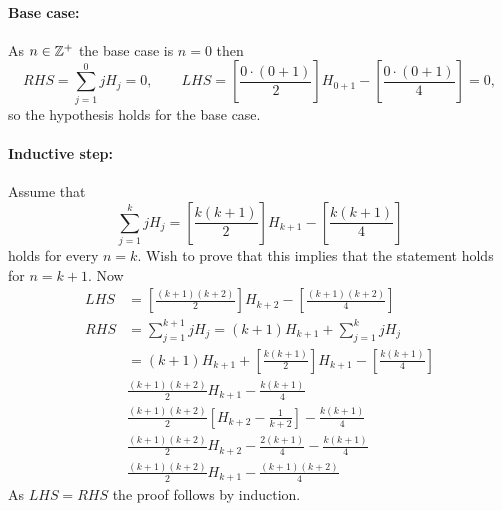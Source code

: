 \documentclass[a4paper, english, 12pt]{article} %
\begin{document}
\begin{answer}
  \paragraph{Base case:} As $n \in \mathbb{Z}^+$ the base case is $n=0$ then
  \begin{equation*}
    RHS = \sum_{j=1}^{0} j H_j = 0, \qquad 
    LHS  
    = \left[ \frac{0 \cdot (0+1)}{2} \right] H_{0+1} - \left[ \frac{0 \cdot (0+1)}{4} \right] = 0,
  \end{equation*}
  so the hypothesis holds for the base case.
  
  \paragraph{Inductive step:}Assume that
  \begin{equation*}
    \sum_{j=1}^k j H_j
    = \left[ \frac{k(k+1)}{2} \right] H_{k+1} - \left[ \frac{k(k+1)}{4} \right]
  \end{equation*}
  holds for every $n = k$. Wish to prove that this implies that the statement
  holds for $n = k + 1$. Now
  \begin{align*}
    LHS & = \left[ \frac{(k+1)(k+2)}{2} \right] H_{k+2} - \left[ \frac{(k+1)(k+2)}{4} \right]\\
    RHS & = \sum_{j=1}^{k+1} j H_j = (k+1) H_{k+1} + \sum_{j=1}^{k} j H_j \\
        & = (k+1)H_{k+1} + \left[ \frac{k(k+1)}{2} \right] H_{k+1} - \left[ \frac{k(k+1)}{4} \right] \\
        & \frac{(k+1)(k+2)}{2} H_{k+1} - \frac{k(k+1)}{4} \\
        & \frac{(k+1)(k+2)}{2} \left[ H_{k+2} - \frac{1}{k+2} \right] - \frac{k(k+1)}{4} \\
        & \frac{(k+1)(k+2)}{2} H_{k+2} - \frac{2(k+1)}{4} - \frac{k(k+1)}{4} \\
        & \frac{(k+1)(k+2)}{2} H_{k+1} - \frac{(k+1)(k+2)}{4}
  \end{align*}
  As $LHS = RHS$ the proof follows by induction.
\end{answer}
\end{document}
